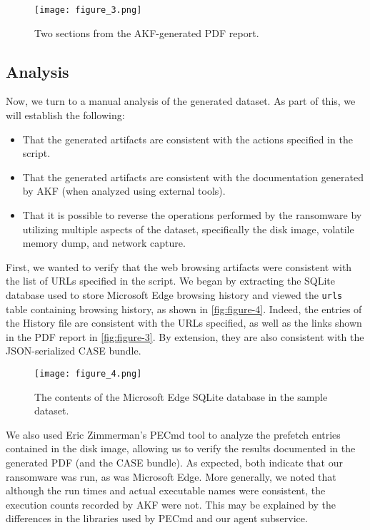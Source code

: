 \documentclass[preprint,12pt]{elsarticle}
\newcommand{\passthrough}[1]{#1}
\begin{document}
\begin{figure}[htbp]
\centering
\texttt{[image: figure\_3.png]}
\caption{Two sections from the AKF-generated PDF
report.}\label{fig:figure-3}
\end{figure}

\subsection{Analysis}\label{analysis}

Now, we turn to a manual analysis of the generated dataset. As part of
this, we will establish the following:

\begin{itemize}
\item
  That the generated artifacts are consistent with the actions specified
  in the script.
\item
  That the generated artifacts are consistent with the documentation
  generated by AKF (when analyzed using external tools).
\item
  That it is possible to reverse the operations performed by the
  ransomware by utilizing multiple aspects of the dataset, specifically
  the disk image, volatile memory dump, and network capture.
\end{itemize}

First, we wanted to verify that the web browsing artifacts were
consistent with the list of URLs specified in the script. We began by
extracting the SQLite database used to store Microsoft Edge browsing
history and viewed the \passthrough{\lstinline!urls!} table containing
browsing history, as shown in \autoref{fig:figure-4}. Indeed, the
entries of the History file are consistent with the URLs specified, as
well as the links shown in the PDF report in \autoref{fig:figure-3}. By
extension, they are also consistent with the JSON-serialized CASE
bundle.

\begin{figure}[htbp]
\centering
\texttt{[image: figure\_4.png]}
\caption{The contents of the Microsoft Edge SQLite database in the
sample dataset.}\label{fig:figure-4}
\end{figure}

We also used Eric Zimmerman's PECmd tool to analyze the prefetch entries
contained in the disk image, allowing us to verify the results
documented in the generated PDF (and the CASE bundle). As expected, both
indicate that our ransomware was run, as was Microsoft Edge. More
generally, we noted that although the run times and actual executable
names were consistent, the execution counts recorded by AKF were not.
This may be explained by the differences in the libraries used by PECmd
and our agent subservice.
\end{document}
